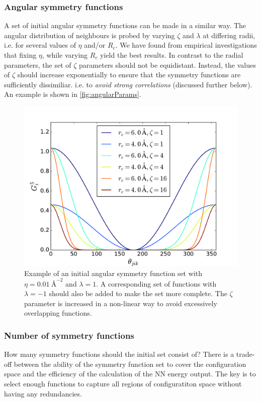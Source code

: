 \documentclass[twoside,english]{uiofysmaster}
\begin{document}
\subsubsection{Angular symmetry functions}
A set of initial angular symmetry functions can be made in a similar way. 
The angular distribution of neighbours is probed by varying $\zeta$ and $\lambda$ at differing radii, i.e. for 
several values of $\eta$ and/or $R_c$. 
We have found from empirical investigations that fixing $\eta$, while varying $R_c$ yield the best results. 
In contrast to the radial parameters, the set of $\zeta$ parameters should not be equidistant. Instead, the values of $\zeta$
should increase exponentially to ensure that the symmetry functions are sufficiently dissimiliar. i.e. to \textit{avoid
strong correlations} (discussed further below).  An example is shown in \autoref{fig:angularParams}. 
\begin{figure}
\centering
  \includegraphics[width = 0.7\linewidth]{Figures/Implementation/angularParams1.pdf}
  \caption{Example of an initial angular symmetry function set
  with $\eta = \SI{0.01}{\angstrom}^{-2}$ and 
  $\lambda = 1$. A corresponding set of functions with $\lambda = -1$ should also be added to make the set more complete. 
  The $\zeta$ parameter is increased in a non-linear way to avoid excessively overlapping functions. }
  \label{fig:angularParams}
\end{figure}

\subsubsection{Number of symmetry functions}
How many symmetry functions should the initial set consist of?
There is a trade-off between the ability of the symmetry function set to cover the configuration space and 
the efficiency of the calculation of the NN energy output. The key is to select enough functions to capture 
all regions of configuratiton space without having any redundancies. 
\end{document}
